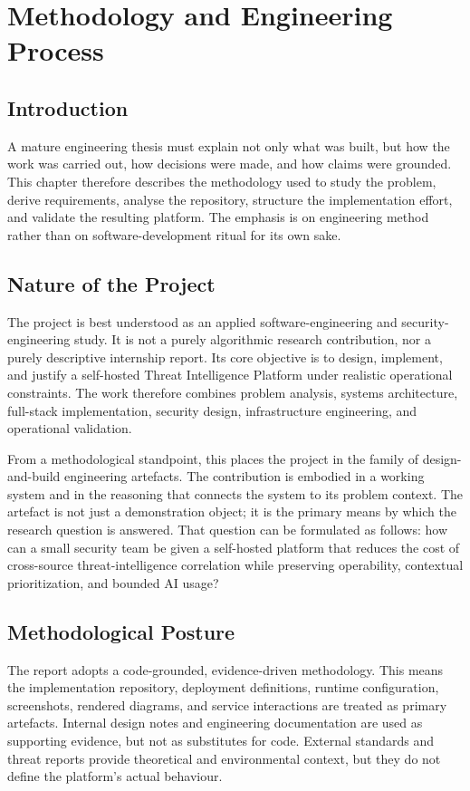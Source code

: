 \chapter{Methodology and Engineering Process}
\thispagestyle{plain}
\section*{Introduction}
A mature engineering thesis must explain not only what was built, but how the work was carried out, how decisions were made, and how claims were grounded. This chapter therefore describes the methodology used to study the problem, derive requirements, analyse the repository, structure the implementation effort, and validate the resulting platform. The emphasis is on engineering method rather than on software-development ritual for its own sake.

\section{Nature of the Project}
The project is best understood as an applied software-engineering and security-engineering study. It is not a purely algorithmic research contribution, nor a purely descriptive internship report. Its core objective is to design, implement, and justify a self-hosted Threat Intelligence Platform under realistic operational constraints. The work therefore combines problem analysis, systems architecture, full-stack implementation, security design, infrastructure engineering, and operational validation.

From a methodological standpoint, this places the project in the family of design-and-build engineering artefacts. The contribution is embodied in a working system and in the reasoning that connects the system to its problem context. The artefact is not just a demonstration object; it is the primary means by which the research question is answered. That question can be formulated as follows: how can a small security team be given a self-hosted platform that reduces the cost of cross-source threat-intelligence correlation while preserving operability, contextual prioritization, and bounded AI usage?

\section{Methodological Posture}
The report adopts a code-grounded, evidence-driven methodology. This means the implementation repository, deployment definitions, runtime configuration, screenshots, rendered diagrams, and service interactions are treated as primary artefacts. Internal design notes and engineering documentation are used as supporting evidence, but not as substitutes for code. External standards and threat reports provide theoretical and environmental context, but they do not define the platform's actual behaviour.

